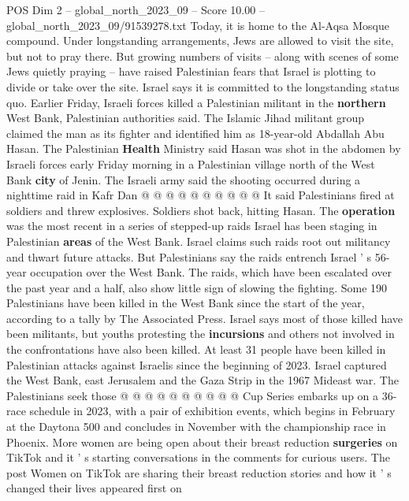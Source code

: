 \begin{textsample}{POS Dim 2 – global\_north\_2023\_09 – Score 10.00 – global\_north\_2023\_09/91539278.txt}
Today, it is home to the Al-Aqsa Mosque compound.
Under longstanding arrangements, Jews are allowed to visit the site, but not to pray there.
But growing numbers of visits -- along with scenes of some Jews quietly praying -- have raised Palestinian fears that Israel is plotting to divide or take over the site.
Israel says it is committed to the longstanding status quo.
Earlier Friday, Israeli forces killed a Palestinian militant in the \textbf{northern} West Bank, Palestinian authorities said.
The Islamic Jihad militant group claimed the man as its fighter and identified him as 18-year-old Abdallah Abu Hasan.
The Palestinian \textbf{Health} Ministry said Hasan was shot in the abdomen by Israeli forces early Friday morning in a Palestinian village north of the West Bank \textbf{city} of Jenin.
The Israeli army said the shooting occurred during a nighttime raid in Kafr Dan @ @ @ @ @ @ @ @ @ @ It said Palestinians fired at soldiers and threw explosives.
Soldiers shot back, hitting Hasan.
The \textbf{operation} was the most recent in a series of stepped-up raids Israel has been staging in Palestinian \textbf{areas} of the West Bank.
Israel claims such raids root out militancy and thwart future attacks.
But Palestinians say the raids entrench Israel ' s 56-year occupation over the West Bank.
The raids, which have been escalated over the past year and a half, also show little sign of slowing the fighting.
Some 190 Palestinians have been killed in the West Bank since the start of the year, according to a tally by The Associated Press.
Israel says most of those killed have been militants, but youths protesting the \textbf{incursions} and others not involved in the confrontations have also been killed.
At least 31 people have been killed in Palestinian attacks against Israelis since the beginning of 2023.
Israel captured the West Bank, east Jerusalem and the Gaza Strip in the 1967 Mideast war.
The Palestinians seek those @ @ @ @ @ @ @ @ @ @ Cup Series embarks up on a 36-race schedule in 2023, with a pair of exhibition events, which begins in February at the Daytona 500 and concludes in November with the championship race in Phoenix.
More women are being open about their breast reduction \textbf{surgeries} on TikTok and it ' s starting conversations in the comments for curious users.
The post Women on TikTok are sharing their breast reduction stories and how it ' s changed their lives appeared first on

\end{textsample}
